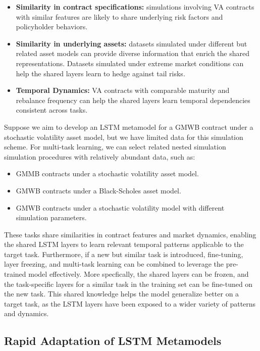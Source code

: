 \begin{itemize} 
    \item   \textbf{Similarity in contract specifications:} 
            simulations involving VA contracts with similar features are likely to share underlying risk factors and policyholder behaviors. 
    \item   \textbf{Similarity in underlying assets:} 
            datasets simulated under different but related asset models can provide diverse information that enrich the shared representations.
            Datasets simulated under extreme market conditions can help the shared layers learn to hedge against tail risks.
    \item   \textbf{Temporal Dynamics:} 
            VA contracts with comparable maturity and rebalance frequency can help the shared layers learn temporal dependencies consistent across tasks. 
\end{itemize}

Suppose we aim to develop an LSTM metamodel for a GMWB contract under a stochastic volatility asset model, but we have limited data for this simulation scheme. 
For multi-task learning, we can select related nested simulation simulation procedures with relatively abundant data, such as:

\begin{itemize} 
    \item GMMB contracts under a stochastic volatility asset model. 
    \item GMWB contracts under a Black-Scholes asset model. 
    \item GMWB contracts under a stochastic volatility model with different simulation parameters.
\end{itemize}

These tasks share similarities in contract features and market dynamics, enabling the shared LSTM layers to learn relevant temporal patterns applicable to the target task.
Furthermore, if a new but similar task is introduced, fine-tuning, layer freezing, and multi-task learning can be combined to leverage the pre-trained model effectively.
More specfically, the shared layers can be frozen, and the task-specific layers for a similar task in the training set can be fine-tuned on the new task.
This shared knowledge helps the model generalize better on a target task, as the LSTM layers have been exposed to a wider variety of patterns and dynamics.

\subsection{Rapid Adaptation of LSTM Metamodels} \label{sec3:transfer_learning}

